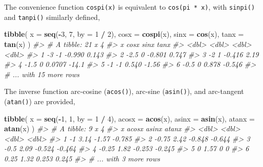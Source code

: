 \documentclass[]{book}
\newenvironment{Shaded}{\begin{snugshade}}{\end{snugshade}}
\newcommand{\CommentTok}[1]{\textcolor[rgb]{0.56,0.35,0.01}{\textit{#1}}}
\newcommand{\DataTypeTok}[1]{\textcolor[rgb]{0.13,0.29,0.53}{#1}}
\newcommand{\DecValTok}[1]{\textcolor[rgb]{0.00,0.00,0.81}{#1}}
\newcommand{\KeywordTok}[1]{\textcolor[rgb]{0.13,0.29,0.53}{\textbf{#1}}}
\newcommand{\NormalTok}[1]{#1}
\newcommand{\OperatorTok}[1]{\textcolor[rgb]{0.81,0.36,0.00}{\textbf{#1}}}
\newcommand{\StringTok}[1]{\textcolor[rgb]{0.31,0.60,0.02}{#1}}
\theoremstyle{plain}
\theoremstyle{remark}
\theoremstyle{definition}
\theoremstyle{definition}
\theoremstyle{definition}
\theoremstyle{remark}
\begin{document}
The convenience function \texttt{cospi(x)} is equivalent to
\texttt{cos(pi\ *\ x)}, with \texttt{sinpi()} and \texttt{tanpi()}
similarly defined,

\begin{Shaded}
\begin{Highlighting}[]
\KeywordTok{tibble}\NormalTok{(}
  \DataTypeTok{x =} \KeywordTok{seq}\NormalTok{(}\OperatorTok{-}\DecValTok{3}\NormalTok{, }\DecValTok{7}\NormalTok{, }\DataTypeTok{by =} \DecValTok{1} \OperatorTok{/}\StringTok{ }\DecValTok{2}\NormalTok{),}
  \DataTypeTok{cosx =} \KeywordTok{cospi}\NormalTok{(x),}
  \DataTypeTok{sinx =} \KeywordTok{cos}\NormalTok{(x),}
  \DataTypeTok{tanx =} \KeywordTok{tan}\NormalTok{(x)}
\NormalTok{)}
\CommentTok{#> # A tibble: 21 x 4}
\CommentTok{#>       x  cosx    sinx    tanx}
\CommentTok{#>   <dbl> <dbl>   <dbl>   <dbl>}
\CommentTok{#> 1  -3      -1 -0.990    0.143}
\CommentTok{#> 2  -2.5     0 -0.801    0.747}
\CommentTok{#> 3  -2       1 -0.416    2.19 }
\CommentTok{#> 4  -1.5     0  0.0707 -14.1  }
\CommentTok{#> 5  -1      -1  0.540   -1.56 }
\CommentTok{#> 6  -0.5     0  0.878   -0.546}
\CommentTok{#> # ... with 15 more rows}
\end{Highlighting}
\end{Shaded}

The inverse function arc-cosine (\texttt{acos()}), arc-sine
(\texttt{asin()}), and arc-tangent (\texttt{atan()}) are provided,

\begin{Shaded}
\begin{Highlighting}[]
\KeywordTok{tibble}\NormalTok{(}
  \DataTypeTok{x =} \KeywordTok{seq}\NormalTok{(}\OperatorTok{-}\DecValTok{1}\NormalTok{, }\DecValTok{1}\NormalTok{, }\DataTypeTok{by =} \DecValTok{1} \OperatorTok{/}\StringTok{ }\DecValTok{4}\NormalTok{),}
  \DataTypeTok{acosx =} \KeywordTok{acos}\NormalTok{(x),}
  \DataTypeTok{asinx =} \KeywordTok{asin}\NormalTok{(x),}
  \DataTypeTok{atanx =} \KeywordTok{atan}\NormalTok{(x)}
\NormalTok{)}
\CommentTok{#> # A tibble: 9 x 4}
\CommentTok{#>       x acosx  asinx  atanx}
\CommentTok{#>   <dbl> <dbl>  <dbl>  <dbl>}
\CommentTok{#> 1 -1     3.14 -1.57  -0.785}
\CommentTok{#> 2 -0.75  2.42 -0.848 -0.644}
\CommentTok{#> 3 -0.5   2.09 -0.524 -0.464}
\CommentTok{#> 4 -0.25  1.82 -0.253 -0.245}
\CommentTok{#> 5  0     1.57  0      0    }
\CommentTok{#> 6  0.25  1.32  0.253  0.245}
\CommentTok{#> # ... with 3 more rows}
\end{Highlighting}
\end{Shaded}
\end{document}
